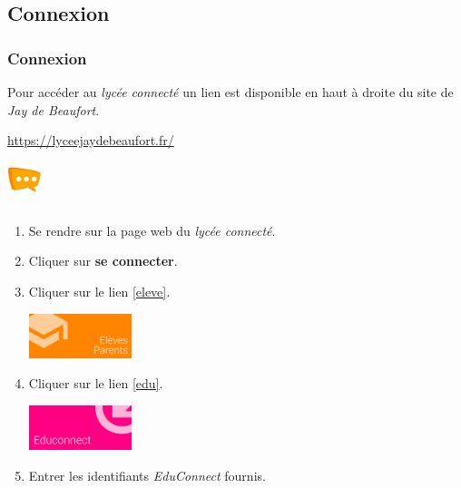 \documentclass[svgnames,11pt]{beamer}
\begin{document}
\subsection{Connexion}
\begin{frame}
    \frametitle{Connexion}

    Pour accéder au \emph{lycée connecté} un lien est disponible en haut à droite du site de \emph{Jay de Beaufort}.
\begin{center}
    {\Large         \url{https://lyceejaydebeaufort.fr/}
    }
\end{center}
\begin{center}
    \includegraphics[width=1cm]{ressources/ent.jpg}
\end{center}

\end{frame}
\begin{frame}
    \frametitle{}

    \begin{activite}
    \begin{enumerate}
        \item Se rendre sur la page web du \emph{lycée connecté}.
        \item Cliquer sur \textbf{se connecter}.
        \item Cliquer sur le lien \ref{eleve}.
        \begin{center}
        \centering
        \includegraphics[width=3cm]{ressources/eleves-parents.png}
        \label{eleve}
        \end{center}
        \item Cliquer sur le lien \ref{edu}.
        \begin{center}
            \centering
            \includegraphics[width=3cm]{ressources/educonnect.png}
            \label{edu}
            \end{center}
        \item Entrer les identifiants \emph{EduConnect} fournis.
    \end{enumerate}
    \end{activite}

\end{frame}
\end{document}
